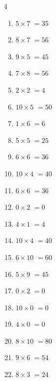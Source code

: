 \begin{multicols}{4}
\begin{enumerate}
  \item $5\times 7$
        $=35$

  \item $8\times 7$
        $=56$

  \item $9\times 5$
        $=45$

  \item $7\times 8$
        $=56$

  \item $2\times 2$
        $=4$

  \item $10\times 5$
        $=50$

  \item $1\times 6$
        $=6$

  \item $5\times 5$
        $=25$

  \item $6\times 6$
        $=36$

  \item $10\times 4$
        $=40$

  \item $6\times 6$
        $=36$

  \item $0\times 2$
        $=0$

  \item $4\times 1$
        $=4$

  \item $10\times 4$
        $=40$

  \item $6\times 10$
        $=60$

  \item $5\times 9$
        $=45$

  \item $0\times 2$
        $=0$

  \item $10\times 0$
        $=0$

  \item $4\times 0$
        $=0$

  \item $8\times 10$
        $=80$

  \item $9\times 6$
        $=54$

\columnbreak %

\resetques

  \item $8\times 3$
        $=24$


\end{enumerate}
\end{multicols}
